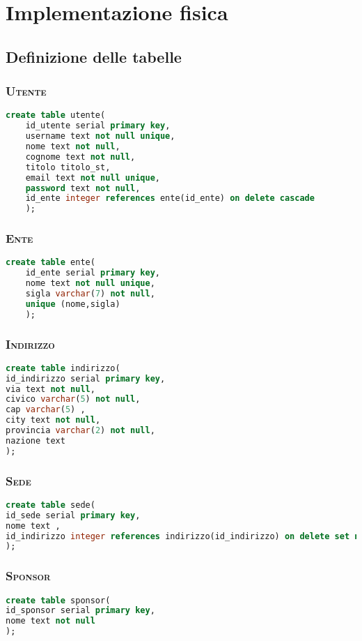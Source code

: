 \chapter{Implementazione fisica}

\section{Definizione delle tabelle}
\subsection{\textsc{Utente}}
\begin{lstlisting}[language=SQL,style=mystyle]
	create table utente(
	id_utente serial primary key,
	username text not null unique,
	nome text not null,
	cognome text not null,
	titolo titolo_st,
	email text not null unique,
	password text not null,
	id_ente integer references ente(id_ente) on delete cascade
	);
\end{lstlisting}
\subsection{\textsc{Ente}}
\begin{lstlisting}[language=SQL,style=mystyle]
	create table ente(
	id_ente serial primary key,
	nome text not null unique,
	sigla varchar(7) not null,
	unique (nome,sigla)
	);
\end{lstlisting}
\subsection{\textsc{Indirizzo}}
\begin{lstlisting}[language=SQL,style=mystyle]
create table indirizzo(
id_indirizzo serial primary key,
via text not null,
civico varchar(5) not null,
cap varchar(5) ,
city text not null,
provincia varchar(2) not null,
nazione text
);
\end{lstlisting}
\subsection{\textsc{Sede}}
\begin{lstlisting}[language=SQL,style=mystyle]
create table sede(
id_sede serial primary key,
nome text ,
id_indirizzo integer references indirizzo(id_indirizzo) on delete set null
);
\end{lstlisting}
\subsection{\textsc{Sponsor}}
\begin{lstlisting}[language=SQL,style=mystyle]
create table sponsor(
id_sponsor serial primary key,
nome text not null
);
\end{lstlisting}
